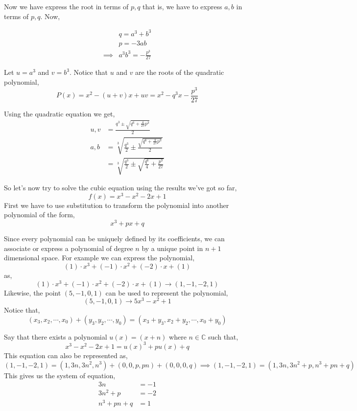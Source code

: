 Now we have express the root in terms of $p, q$ that is, we have to express $a,b$ in terms of $p,q$. Now,

\begin{align*}
         & q = a^{3} + b^{3} \\
         & p = -3ab \\
\implies & a^{3}b^{3} = -\frac{p^{3}}{27}
\end{align*}

Let $u=a^{3}$ and $v=b^{3}$. Notice that $u$ and $v$ are the roots of the quadratic polynomial,
\[
    P(x) = x^{2} - (u+v)x + uv = x^{2} - q^{3}x -\frac{p^{3}}{27} 
\]

Using the quadratic equation we get,
\begin{align*}
    u,v &= \frac{q^{3} \pm \sqrt{q^{6} + \frac{4}{27}p^{3}}}{2} \\
    a,b &= \sqrt[3]{\frac{q^{3}}{2} \pm \frac{\sqrt{q^{6} + \frac{4}{27}p^{3}}}{2}}\\
        &= \sqrt[3]{\frac{q^{3}}{2} \pm \sqrt{\frac{q^{6}}{4} + \frac{p^{3}}{27}}}
\end{align*}

So let's now try to solve the cubic equation using the results we've got so far,
\[
    f(x) = x^{3} - x^{2} - 2x + 1
\]
First we have to use substitution to transform the polynomial into another polynomial of the form,
\[
    x^{3} + px + q
\]

Since every polynomial can be uniquely defined by its coefficients, we can associate or 
express a polynomial of degree $n$ by a unique point in $n+1$ dimensional space. 
For example we can express the polynomial,
\[
    (1) \cdot x^{3} + (-1) \cdot x^{2} + (-2) \cdot x + (1)
\]
as,
\[
    (1) \cdot x^{3} + (-1) \cdot x^{2} + (-2) \cdot x + (1) \rightarrow (1, -1, -2, 1)
\]
Likewise, the point $(5, -1, 0, 1)$ can be used to represent the polynomial,
\[
    (5, -1, 0, 1) \rightarrow 5x^{3} -x^{2} + 1
\]
Notice that,
\[
    (x_{3}, x_{2}, \cdots, x_{0}) + (y_{3}, y_{2}, \cdots, y_{0}) = (x_{3} + y_{3}, x_{2} + y_{2}, \cdots, x_{0} + y_{0})
\]

Say that there exists a polynomial $u(x) = (x+n)$ where $n \in \mathbb{C}$ such that,
\[
    x^{3} - x^{2} -2x + 1 = u(x)^{3} + pu(x) + q
\]
This equation can also be represented as,
\[
    (1, -1, -2, 1) = (1, 3n, 3n^{2}, n^{3}) + (0, 0, p, pn) + (0,0,0,q) \implies (1, -1, -2, 1) = (1, 3n, 3n^{2}+p, n^{3}+ pn + q)
\]
This gives us the system of equation,
\begin{align*}
   3n              &= -1 \\
   3n^{2} + p      &= -2 \\
    n^{3} + pn + q &= 1
\end{align*}

